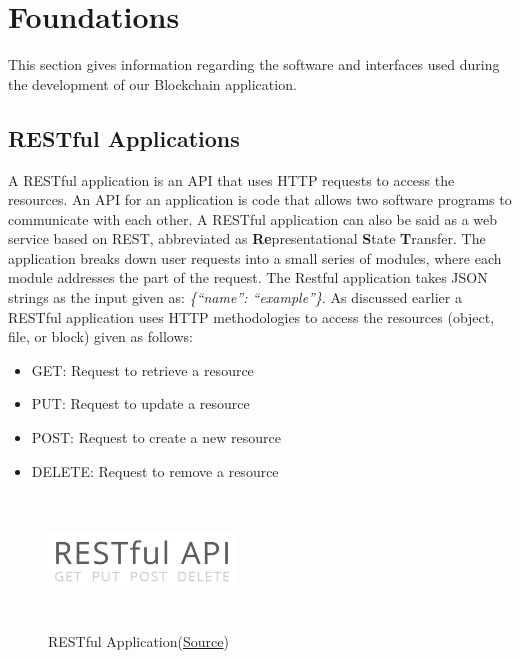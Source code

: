 \documentclass[12pt]{article}
\begin{document}
\section{Foundations} \label{sec:Foundations} %
This section gives information regarding the software and interfaces used during the development of our Blockchain application.

\subsection{RESTful Applications}

A RESTful application is an \ac{API} that uses HTTP requests to access the resources. An API for an application is code that allows two software programs to communicate with each other.
A RESTful application can also be said as a web service based on REST, abbreviated as \textbf{Re}presentational \textbf{S}tate \textbf{T}ransfer. The application breaks down user requests into a small series of modules, where each module addresses the part of the request. The Restful application takes JSON strings as the input given as: \emph{\{“name”: “example”\}}. As discussed earlier a RESTful application uses HTTP methodologies to access the resources (object, file, or block) given as follows:
\begin{itemize}
    \item GET: Request to retrieve a resource
    \item PUT: Request to update a resource
    \item POST: Request to create a new resource
    \item DELETE: Request to remove a resource
\end{itemize}
\begin{figure}[H]
    \centering
    \includegraphics[width=5cm, height=3.5cm]{../report_MemeEcon/images/restful_api.jpg}
    \caption{RESTful Application(\href{https://b2evolution.net/man/rest-api/}{Source})}
    \label{fig:Restful}
\end{figure}
\end{document}
